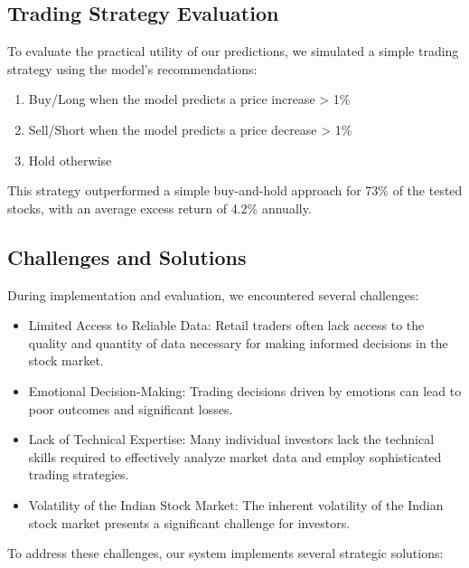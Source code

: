 \documentclass[conference]{IEEEtran}
\begin{document}
\subsection{Trading Strategy Evaluation}
To evaluate the practical utility of our predictions, we simulated a simple trading strategy using the model's recommendations:

\begin{enumerate}
\item Buy/Long when the model predicts a price increase > 1\%
\item Sell/Short when the model predicts a price decrease > 1\%
\item Hold otherwise
\end{enumerate}

This strategy outperformed a simple buy-and-hold approach for 73\% of the tested stocks, with an average excess return of 4.2\% annually.

\subsection{Challenges and Solutions}
During implementation and evaluation, we encountered several challenges:

\begin{itemize}
\item Limited Access to Reliable Data: Retail traders often lack access to the quality and quantity of data necessary for making informed decisions in the stock market.

\item Emotional Decision-Making: Trading decisions driven by emotions can lead to poor outcomes and significant losses.

\item Lack of Technical Expertise: Many individual investors lack the technical skills required to effectively analyze market data and employ sophisticated trading strategies.

\item Volatility of the Indian Stock Market: The inherent volatility of the Indian stock market presents a significant challenge for investors.
\end{itemize}

To address these challenges, our system implements several strategic solutions:
\end{document}
